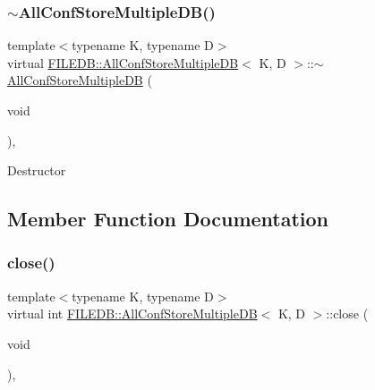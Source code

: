 \subsubsection{\texorpdfstring{$\sim$AllConfStoreMultipleDB()}{~AllConfStoreMultipleDB()}\hspace{0.1cm}{\footnotesize\ttfamily [3/3]}}
{\footnotesize\ttfamily template$<$typename K, typename D$>$ \\
virtual \mbox{\hyperlink{classFILEDB_1_1AllConfStoreMultipleDB}{F\+I\+L\+E\+D\+B\+::\+All\+Conf\+Store\+Multiple\+DB}}$<$ K, D $>$\+::$\sim$\mbox{\hyperlink{classFILEDB_1_1AllConfStoreMultipleDB}{All\+Conf\+Store\+Multiple\+DB}} (\begin{DoxyParamCaption}\item[{void}]{ }\end{DoxyParamCaption})\hspace{0.3cm}{\ttfamily [inline]}, {\ttfamily [virtual]}}

Destructor 

\subsection{Member Function Documentation}
\mbox{\label{classFILEDB_1_1AllConfStoreMultipleDB_a71aed1deeb31450afee4b692941dbae1}} 
\subsubsection{\texorpdfstring{close()}{close()}\hspace{0.1cm}{\footnotesize\ttfamily [1/3]}}
{\footnotesize\ttfamily template$<$typename K, typename D$>$ \\
virtual int \mbox{\hyperlink{classFILEDB_1_1AllConfStoreMultipleDB}{F\+I\+L\+E\+D\+B\+::\+All\+Conf\+Store\+Multiple\+DB}}$<$ K, D $>$\+::close (\begin{DoxyParamCaption}\item[{void}]{ }\end{DoxyParamCaption})\hspace{0.3cm}{\ttfamily [inline]}, {\ttfamily [virtual]}}

\mbox{\label{classFILEDB_1_1AllConfStoreMultipleDB_a71aed1deeb31450afee4b692941dbae1}} 
